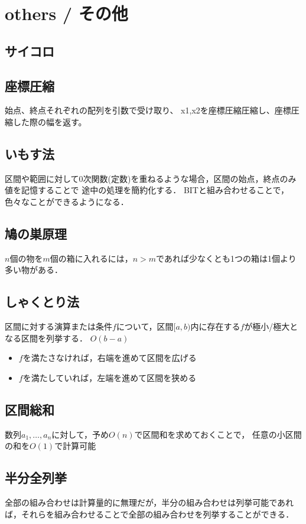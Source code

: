 \section{others / その他}

\subsection{サイコロ}


\subsection{座標圧縮}
始点、終点それぞれの配列を引数で受け取り、
x1,x2を座標圧縮圧縮し、座標圧縮した際の幅を返す。


\subsection{いもす法}
区間や範囲に対して0次関数(定数)を重ねるような場合，区間の始点，終点のみ値を記憶することで
途中の処理を簡約化する．
BITと組み合わせることで，色々なことができるようになる．

\subsection{鳩の巣原理}
$n$個の物を$m$個の箱に入れるには，$n>m$であれば少なくとも1つの箱は1個より多い物がある．

\subsection{しゃくとり法}
区間に対する演算または条件$f$について，区間$[a,b)$内に存在する$f$が極小/極大となる区間を列挙する．
$O(b-a)$
\begin{itemize}
	\item $f$を満たさなければ，右端を進めて区間を広げる
	\item $f$を満たしていれば，左端を進めて区間を狭める
\end{itemize}

\subsection{区間総和}
数列$a_1,\ldots,a_n$に対して，予め$O(n)$で区間和を求めておくことで，
任意の小区間の和を$O(1)$で計算可能

\subsection{半分全列挙}
全部の組み合わせは計算量的に無理だが，半分の組み合わせは列挙可能であれば，それらを組み合わせることで全部の組み合わせを列挙することができる．

